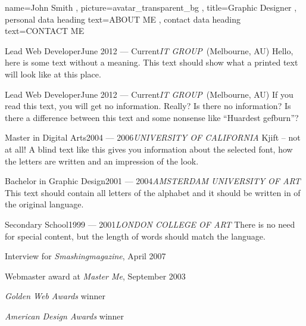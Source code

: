 \documentclass[a4paper, 12pt]{classycv}
\begin{document}
\begin{Resume}[%
    left background color=accent-color%
    , left foreground color=white%
    , left header color=white%
    , delimiter color=white%
    , delimiter width=0pt%
]{%
    name=John Smith%
    , picture={avatar_transparent_bg}%
    , title=Graphic Designer%
    , personal data heading text={\MakeUppercase{about me}}%
    , contact data heading text={\MakeUppercase{contact me}}%
}%
    \begin{Entry}{Lead Web Developer\hfill June 2012 --- Current}{\textit{\MakeUppercase{IT Group}}~(Melbourne, AU)}%
        Hello, here is some text without a meaning. This text should show what a printed text will look like at this place.%
    \end{Entry}%
    \begin{Entry}{Lead Web Developer\hfill June 2012 --- Current}{\textit{\MakeUppercase{IT Group}}~(Melbourne, AU)}%
        If you read this text, you will get no information. Really? Is there no information? Is there a difference between this text and some nonsense like “Huardest gefburn”?%
    \end{Entry}%
    \begin{Entry}{Master in Digital Arts\hfill2004 --- 2006}{\textit{\MakeUppercase{University of California}}}%
        Kjift – not at all! A blind text like this gives you information about the selected font, how the letters are written and an impression of the look.%
    \end{Entry}%
    \begin{Entry}{Bachelor in Graphic Design\hfill2001 --- 2004}{\textit{\MakeUppercase{Amsterdam University of Art}}}%
        This text should contain all letters of the alphabet and it should be written in of the original language.%
    \end{Entry}%
    \begin{Entry}{Secondary School\hfill1999 --- 2001}{\textit{\MakeUppercase{London College of Art}}}%
        There is no need for special content, but the length of words should match the language.%
    \end{Entry}%
    \begin{List}[skip above=0pt, skip below=0pt]
        \item Interview for \textit{Smashingmagazine}, April 2007%
        \item Webmaster award at \textit{Master Me}, September 2003%
        \item \textit{Golden Web Awards} winner%
        \item \textit{American Design Awards} winner%
    \end{List}%
\end{Resume}
\end{document}
